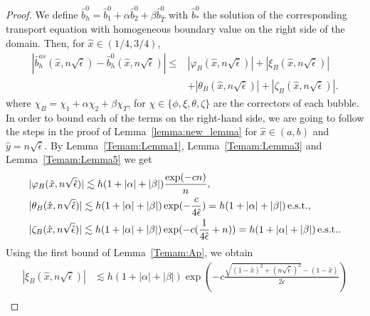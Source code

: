 \documentclass{article}
\newcommand{\est}{\text{\,e.s.t.}\xspace}
\newcommand{\oab}{\ensuremath{1+\alpha+\beta}}
\newcommand{\hatT}{\ensuremath{{\hat{T}}}}
\newcommand{\hatb}{\ensuremath{\hat{b}}}
\newcommand{\hatx}{\ensuremath{{\hat{x}}}}
\newcommand{\haty}{\ensuremath{{\hat{y}}}}
\newcommand{\hatnsep}{\ensuremath{n\sqrt{\hat{\epsilon}}}}
\begin{document}
\begin{appendix}
\begin{proof}
We define $\hatb_h^0 = \hatb_1^0 + \alpha \hatb_2^0 + \beta \hatb_\hatT^0$ with $\hatb_*^0$ the solution of the corresponding transport equation with homogeneous boundary value on the right side of the domain.
Then, for $\hatx\in(1/4,3/4)$,
\begin{equation}\label{eq:bh_b0}
\begin{split}
    |\hatb_h^{as}(\hatx,\hatnsep)-\hatb_h^0(\hatx,\hatnsep)|\leq{}& |\varphi_B(\hatx,\hatnsep)| + |\xi_B(\hatx,\hatnsep)|  
    \\
    &+|\theta_B(\hatx,\hatnsep)| + |\zeta_B(\hatx,\hatnsep)|.
\end{split}
\end{equation}
where $\chi_B = \chi_1 + \alpha\chi_2 + \beta\chi_T$, for $\chi \in \{\phi,\xi,\theta,\zeta\}$ are the correctors of each bubble.
In order to bound each of the terms on the right-hand side, we are going to follow the steps in the proof of Lemma~\ref{lemma:new_lemma} for $\hatx\in(a,b)$ and $\haty=\hatnsep$. By  Lemma~\ref{Temam:Lemma1},  Lemma~\ref{Temam:Lemma3}  and Lemma~\ref{Temam:Lemma5} we get
\begin{equation}
\label{eq:boundACD_2}
\begin{aligned}
    &|\varphi_B(\hatx,\hatnsep)| \lesssim h(1+|\alpha|+|\beta|)\frac{\exp(-cn)}{n},\\
    &|\theta_B(\hatx,\hatnsep)| \lesssim h(1+|\alpha|+|\beta|)\exp(-\frac{c}{4\hat{\epsilon}})=  h(1+|\alpha|+|\beta|)\est,\\
    &|\zeta_B(\hatx,\hatnsep)| 
    \lesssim h(1+|\alpha|+|\beta|)\exp(-c(\frac{1}{4\hat{\epsilon}}+n))
    =  h(1+|\alpha|+|\beta|)\est.
\end{aligned}
\end{equation}
Using the first bound of Lemma~\ref{Temam:Ap}, we obtain
\begin{equation}
\label{eq:boundB_2}
\begin{aligned}
    |\xi_B(\hatx,\hatnsep)|& \lesssim h(1+|\alpha|+|\beta|)
    \exp(-c\frac{\sqrt{(1-\hatx)^2+(\hatnsep)^2}-(1-\hatx)}{2\hat{\epsilon}})\\

\end{aligned}
\end{equation}
\end{proof}
\end{appendix}
\end{document}
